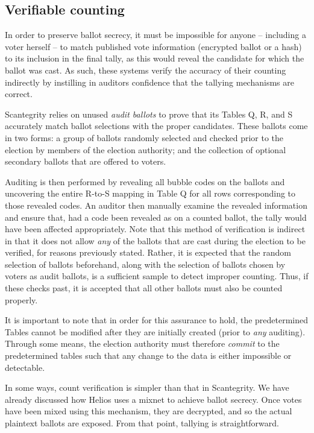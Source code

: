 \documentclass[10pt,twocolumn]{article}
\newcommand{\term}[1]{\textit{#1}}
\begin{document}
\subsection{Verifiable counting}

In order to preserve ballot secrecy, it must be impossible for anyone -- including a voter
herself -- to match published vote information (encrypted ballot or a hash) to its inclusion in
the final tally, as this would reveal the candidate for which the ballot was cast. As such, these
systems verify the accuracy of their counting indirectly by instilling in auditors confidence that
the tallying mechanisms are correct.

Scantegrity relies on unused \term{audit ballots} to prove that its Tables Q, R, and S accurately
match ballot selections with the proper candidates. These ballots come in two forms: a group of
ballots randomly selected and checked prior to the election by members of the election authority;
and the collection of optional secondary ballots that are offered to voters.

Auditing is then performed by revealing all bubble codes on the ballots and uncovering the entire
R-to-S mapping in Table Q for all rows corresponding to those revealed codes. An auditor then
manually examine the revealed information and ensure that, had a code been revealed as on a counted
ballot, the tally would have been affected appropriately. Note that this method of verification is
indirect in that it does not allow \emph{any} of the ballots that are cast during the election to be
verified, for reasons previously stated. Rather, it is expected that the random selection of ballots
beforehand, along with the selection of ballots chosen by voters as audit ballots, is a sufficient
sample to detect improper counting. Thus, if these checks past, it is accepted that all other
ballots must also be counted properly.

It is important to note that in order for this assurance to hold, the predetermined Tables cannot be
modified after they are initially created (prior to \emph{any} auditing). Through some means, the
election authority must therefore \term{commit} to the predetermined tables such that any change to
the data is either impossible or detectable.

In some ways, count verification is simpler than that in Scantegrity. We have already discussed how
Helios uses a mixnet to achieve ballot secrecy. Once votes have been mixed using this mechanism,
they are decrypted, and so the actual plaintext ballots are exposed. From that point, tallying is
straightforward.
\end{document}
